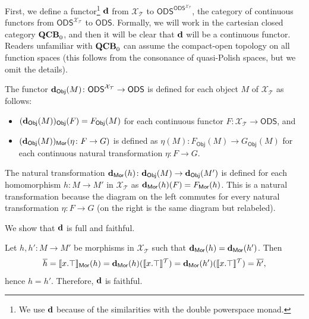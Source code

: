 \documentclass{article}
\theoremstyle{plain}
\def\cal#1{{\mathcal #1}}
\def\QCB{{{\bf QCB}_0}}
\def\calT{{\cal T}}
\def\calX{{\cal X}}
\newcommand{\ODS}{{\mathsf{ODS}}}
\def\QCB{{{\bf QCB}_0}}
\newcommand{\y}{{\mathsf{\bf d}}}
\newcommand{\Mor}{\mathsf{Mor}}
\newcommand{\Obj}{\mathsf{Obj}}
\begin{document}
First, we define a functor\footnote{We use $\y$ because of the similarities with the double powerspace monad.} $\y$ from $\calX_\calT$ to $\ODS^{\ODS^{\calX_\calT}}$, the category of continuous functors from $\ODS^{\calX_\calT}$  to $\ODS$. Formally, we will work in the cartesian closed category $\QCB$, and then it will be clear that $\y$ will be a continuous functor. Readers unfamiliar with $\QCB$ can assume the compact-open topology on all function spaces (this follows from the consonance of quasi-Polish spaces, but we omit the details).

The functor $\y_\Obj(M)\colon \ODS^{\calX_\calT} \to \ODS$ is defined for each object $M$ of $\calX_\calT$ as follows:
\begin{itemize}
\item
$(\y_\Obj(M))_\Obj(F)=F_\Obj(M)$ for each continuous functor $F\colon \calX_\calT \to \ODS$, and
\item
$(\y_\Obj(M))_\Mor(\eta\colon F\to G)$ is defined as $\eta(M)\colon F_\Obj(M)\to G_\Obj(M)$  for each continuous natural transformation $\eta \colon F\to G$. 
\end{itemize}
The natural transformation $\y_\Mor(h)\colon \y_\Obj(M) \to \y_\Obj(M')$ is defined for each homomorphism $h\colon M\to M'$ in $\calX_\calT$ as $\y_\Mor(h)(F)=F_\Mor(h)$. This is a natural transformation because the diagram on the left commutes for every natural transformation $\eta\colon F\to G$ (on the right is the same diagram but relabeled).
\begin{center}
\qquad
{}
\end{center}

We show that $\y$ is full and faithful.

Let $h,h'\colon M\to M'$ be morphisms in $\calX_\calT$ such that $\y_\Mor(h)=\y_\Mor(h')$. Then \[\overline{h}=\llbracket x.\top\rrbracket_\Mor(h) = \y_\Mor(h)(\llbracket x.\top\rrbracket^\calT) =  \y_\Mor(h')(\llbracket x.\top\rrbracket^\calT) =\overline{h'},\]
hence $h=h'$. Therefore, $\y$ is faithful.
\end{document}
